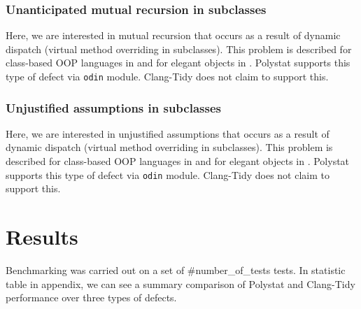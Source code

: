 \subsubsection{Unanticipated mutual recursion in subclasses}

Here, we are interested in mutual recursion that occurs as a result of dynamic dispatch (virtual method overriding in subclasses). This problem is described for class-based OOP languages in \cite[Section 3.1]{MikhajlovSekerinski1998} and for elegant objects in \cite[Section 3.2]{KudasovShilovStepanov2021}. Polystat supports this type of defect via \texttt{odin} module. Clang-Tidy does not claim to support this.

\subsubsection{Unjustified assumptions in subclasses}

Here, we are interested in unjustified assumptions that occurs as a result of dynamic dispatch (virtual method overriding in subclasses). This problem is described for class-based OOP languages in \cite[Section 3.3]{MikhajlovSekerinski1998} and for elegant objects in \cite{KudasovSim2022}. Polystat supports this type of defect via \texttt{odin} module. Clang-Tidy does not claim to support this.

\section{Results}
Benchmarking was carried out on a set of #number_of_tests tests. In statistic table in appendix, we can see a summary comparison of Polystat and Clang-Tidy performance over three types of defects.

